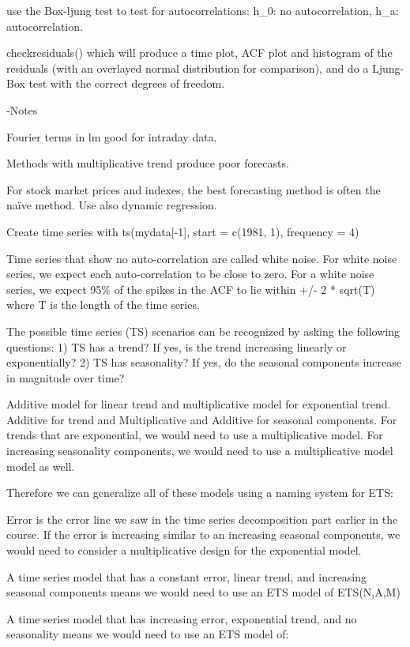 \documentclass[]{book}
\begin{document}
use the Box-ljung test to test for autocorrelations: h\_0: no
autocorrelation, h\_a: autocorrelation.

checkresiduals() which will produce a time plot, ACF plot and histogram
of the residuals (with an overlayed normal distribution for comparison),
and do a Ljung-Box test with the correct degrees of freedom.

-Notes

Fourier terms in lm good for intraday data.

Methods with multiplicative trend produce poor forecasts.

For stock market prices and indexes, the best forecasting method is
often the naïve method. Use also dynamic regression.

Create time series with ts(mydata{[}-1{]}, start = c(1981, 1), frequency
= 4)

Time series that show no auto-correlation are called white noise. For
white noise series, we expect each auto-correlation to be close to zero.
For a white noise series, we expect 95\% of the spikes in the ACF to lie
within +/- 2 * sqrt(T) where T is the length of the time series.

The possible time series (TS) scenarios can be recognized by asking the
following questions: 1) TS has a trend? If yes, is the trend increasing
linearly or exponentially? 2) TS has seasonality? If yes, do the
seasonal components increase in magnitude over time?

Additive model for linear trend and multiplicative model for exponential
trend. Additive for trend and Multiplicative and Additive for seasonal
components. For trends that are exponential, we would need to use a
multiplicative model. For increasing seasonality components, we would
need to use a multiplicative model model as well.

Therefore we can generalize all of these models using a naming system
for ETS:

Error is the error line we saw in the time series decomposition part
earlier in the course. If the error is increasing similar to an
increasing seasonal components, we would need to consider a
multiplicative design for the exponential model.

A time series model that has a constant error, linear trend, and
increasing seasonal components means we would need to use an ETS model
of ETS(N,A,M)

A time series model that has increasing error, exponential trend, and no
seasonality means we would need to use an ETS model of:
\end{document}
